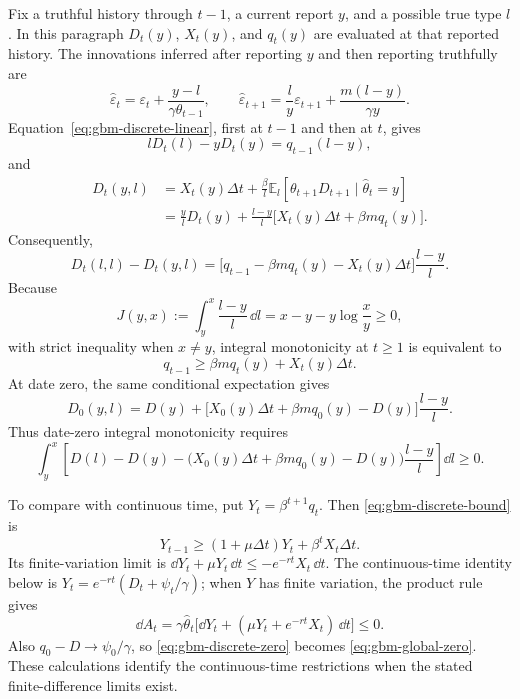 \documentclass[12pt]{article}
\newcommand{\E}{\mathbb{E}}
\newcommand{\hth}{\hat\theta}
\begin{document}
Fix a truthful history through \(t-1\), a current report \(y\), and
a possible true type \(l\). In this paragraph \(D_t(y)\), \(X_t(y)\),
and \(q_t(y)\) are evaluated at that reported history. The innovations
inferred after reporting \(y\) and then reporting truthfully are
\[
  \hat\varepsilon_t
   =\varepsilon_t+\frac{y-l}{\gamma\theta_{t-1}},
  \qquad
  \hat\varepsilon_{t+1}
   =\frac ly\varepsilon_{t+1}
      +\frac{m(l-y)}{\gamma y}.
\]
Equation~\eqref{eq:gbm-discrete-linear}, first at \(t-1\) and then
at \(t\), gives
\[
  lD_t(l)-yD_t(y)=q_{t-1}(l-y),
\]
and
\begin{align*}
  D_t(y,l)
  &=X_t(y)\Delta t
    +\frac\beta l\E_l[\theta_{t+1}D_{t+1}\mid\hth_t=y]\\
  &=\frac ylD_t(y)+\frac{l-y}{l}
       \bigl[X_t(y)\Delta t+\beta m q_t(y)\bigr].
\end{align*}
Consequently,
\begin{equation}\label{eq:gbm-discrete-rent-difference}
  D_t(l,l)-D_t(y,l)
  =\bigl[q_{t-1}-\beta m q_t(y)-X_t(y)\Delta t\bigr]
      \frac{l-y}{l}.
\end{equation}
Because
\[
  J(y,x):=\int_y^x\frac{l-y}{l}\,\dd l
     =x-y-y\log\frac xy\geq0,
\]
with strict inequality when \(x\ne y\), integral monotonicity at
\(t\geq1\) is equivalent to
\begin{equation}\label{eq:gbm-discrete-bound}
  q_{t-1}\geq\beta m q_t(y)+X_t(y)\Delta t.
\end{equation}
At date zero, the same conditional expectation gives
\[
  D_0(y,l)
   =D(y)+\bigl[X_0(y)\Delta t+\beta m q_0(y)-D(y)\bigr]
       \frac{l-y}{l}.
\]
Thus date-zero integral monotonicity requires
\begin{equation}\label{eq:gbm-discrete-zero}
  \int_y^x\!\left[
    D(l)-D(y)
    -\bigl(X_0(y)\Delta t+\beta m q_0(y)-D(y)\bigr)
       \frac{l-y}{l}
  \right]\dd l\geq0.
\end{equation}

To compare with continuous time, put \(Y_t=\beta^{t+1}q_t\).
Then \eqref{eq:gbm-discrete-bound} is
\[
  Y_{t-1}\geq(1+\mu\Delta t)Y_t+\beta^tX_t\Delta t.
\]
Its finite-variation limit is
\(\dd Y_t+\mu Y_t\,\dd t\leq-e^{-rt}X_t\,\dd t\).
The continuous-time identity below is
\(Y_t=e^{-rt}(D_t+\psi_t/\gamma)\); when \(Y\) has finite
variation, the product rule gives
\[
  \dd A_t
  =\gamma\hth_t
    \bigl[\dd Y_t+(\mu Y_t+e^{-rt}X_t)\,\dd t\bigr]\leq0.
\]
Also \(q_0-D\to\psi_0/\gamma\), so
\eqref{eq:gbm-discrete-zero} becomes \eqref{eq:gbm-global-zero}.
These calculations identify the continuous-time restrictions when
the stated finite-difference limits exist.
\end{document}
